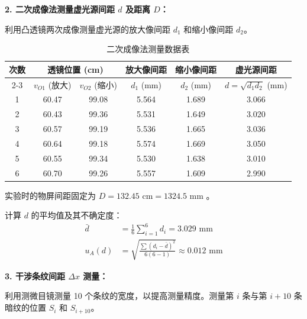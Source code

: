 \documentclass[10pt,a4paper]{ctexart}
\newcommand{\myspace}[1]{\par\vspace{#1\baselineskip}} %
\begin{document}
    \textbf{2. 二次成像法测量虚光源间距 $d$ 及距离 $D$：}

    利用凸透镜两次成像测量虚光源的放大像间距 $d_1$ 和缩小像间距 $d_2$。

    \begin{table}[H]
    \centering 
    \caption{二次成像法测量数据表}
    \label{tab:bessel_method} 
    \begin{tabular}{cccccc}
        \toprule
        \multirow{2}{*}{次数} & \multicolumn{2}{c}{透镜位置 (cm)} & 放大像间距 & 缩小像间距 & 虚光源间距 \\
        \cmidrule(lr){2-3} 
        & $v_{O1}$ (放大) & $v_{O2}$ (缩小) & $d_1$ (mm) & $d_2$ (mm) & $d=\sqrt{d_1 d_2}$ (mm) \\ 
        \midrule
        1 & 60.47 & 99.08 & 5.564 & 1.689 & 3.066 \\
        2 & 60.43 & 99.36 & 5.531 & 1.649 & 3.020 \\
        3 & 60.57 & 99.19 & 5.536 & 1.665 & 3.036 \\
        4 & 60.64 & 99.18 & 5.574 & 1.669 & 3.050 \\
        5 & 60.55 & 99.34 & 5.530 & 1.638 & 3.010 \\
        6 & 60.70 & 99.26 & 5.557 & 1.609 & 2.990 \\
        \bottomrule
    \end{tabular}
    \end{table}

    实验时的物屏间距固定为 $D = 132.45 \text{ cm} = 1324.5 \text{ mm}$ 。
    
    计算 $d$ 的平均值及其不确定度：
    \begin{align*}
        \bar{d} &= \frac{1}{6}\sum_{i=1}^6 d_i = 3.029 \text{ mm} \\
        u_A(d) &= \sqrt{\frac{\sum(d_i - \bar{d})^2}{6(6-1)}} \approx 0.012 \text{ mm}
    \end{align*}

    \myspace{1}

    \textbf{3. 干涉条纹间距 $\Delta x$ 测量：}
    
    利用测微目镜测量 10 个条纹的宽度，以提高测量精度。测量第 $i$ 条与第 $i+10$ 条暗纹的位置 $S_i$ 和 $S_{i+10}$。
\end{document}
